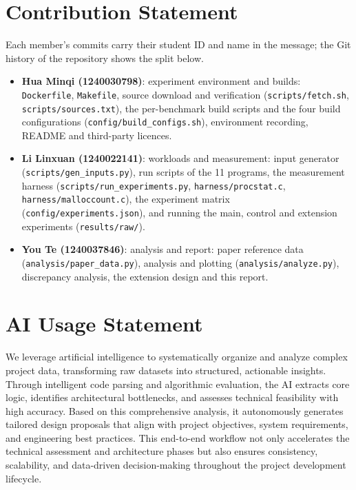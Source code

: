 \documentclass[10pt,a4paper]{article}
\newcommand{\cmd}[1]{\texttt{#1}}
\begin{document}


\section*{Contribution Statement}
Each member's commits carry their student ID and name in the message; the Git
history of the repository shows the split below.
\begin{itemize}
\item \textbf{Hua Minqi (1240030798)}: experiment environment and builds:
\cmd{Dockerfile}, \cmd{Makefile}, source download and verification
(\cmd{scripts/fetch.sh}, \cmd{scripts/sources.txt}), the per-benchmark build
scripts and the four build configurations (\cmd{config/build\_configs.sh}),
environment recording, README and third-party licences.
\item \textbf{Li Linxuan (1240022141)}: workloads and measurement: input
generator (\cmd{scripts/gen\_inputs.py}), run scripts of the 11 programs, the
measurement harness (\cmd{scripts/run\_experiments.py},
\cmd{harness/procstat.c}, \cmd{harness/malloccount.c}), the experiment matrix
(\cmd{config/experiments.json}), and running the main, control and extension
experiments (\cmd{results/raw/}).
\item \textbf{You Te (1240037846)}: analysis and report: paper reference data
(\cmd{analysis/paper\_data.py}), analysis and plotting
(\cmd{analysis/analyze.py}), discrepancy analysis, the extension design and
this report.
\end{itemize}

\section*{AI Usage Statement}
We leverage artificial intelligence to systematically organize and analyze complex project data, transforming raw datasets into structured, actionable insights. Through intelligent code parsing and algorithmic evaluation, the AI extracts core logic, identifies architectural bottlenecks, and assesses technical feasibility with high accuracy. Based on this comprehensive analysis, it autonomously generates tailored design proposals that align with project objectives, system requirements, and engineering best practices. This end-to-end workflow not only accelerates the technical assessment and architecture phases but also ensures consistency, scalability, and data-driven decision-making throughout the project development lifecycle.
\end{document}
